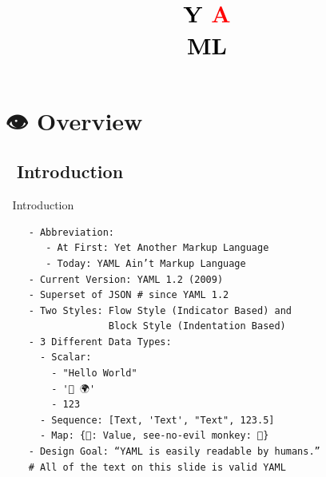 \documentclass{beamer}
\title{\texorpdfstring{\vspace{2cm}\\
       \hspace{-3mm}\textbf{\textcolor{black}{Y}
       \hspace{-3.6mm}\textcolor{red}{A}\\[-10pt]
       \hspace{+3mm}\textcolor{black}{ML}}\vspace{-1cm}}{YAML}}
\date{\textit{\Subject}}
\begin{document}
{
  \begin{frame}[plain]
      \titlepage
  \end{frame}
}

\section{👁 Overview}
\subsection{🐪 Introduction}

\begin{frame}[fragile]{🐪 Introduction}
  \begin{verbatim}
    - Abbreviation:
       - At First: Yet Another Markup Language
       - Today: YAML Ain’t Markup Language
    - Current Version: YAML 1.2 (2009)
    - Superset of JSON # since YAML 1.2
    - Two Styles: Flow Style (Indicator Based) and
                  Block Style (Indentation Based)
    - 3 Different Data Types:
      - Scalar:
        - "Hello World"
        - '👋 🌍'
        - 123
      - Sequence: [Text, 'Text', "Text", 123.5]
      - Map: {🔑: Value, see-no-evil monkey: 🙈}
    - Design Goal: “YAML is easily readable by humans.”
    # All of the text on this slide is valid YAML
  \end{verbatim}
\end{frame}
\end{document}
